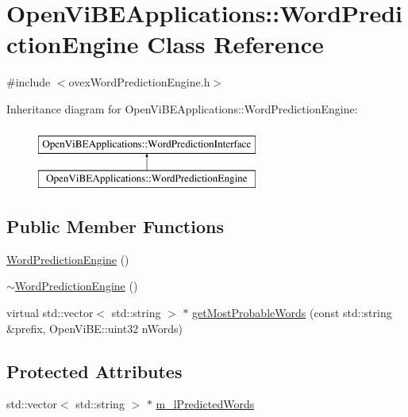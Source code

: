 \hypertarget{classOpenViBEApplications_1_1WordPredictionEngine}{
\section{OpenViBEApplications::WordPredictionEngine Class Reference}
\label{classOpenViBEApplications_1_1WordPredictionEngine}
}


{\ttfamily \#include $<$ovexWordPredictionEngine.h$>$}

Inheritance diagram for OpenViBEApplications::WordPredictionEngine:\begin{figure}[H]
\begin{center}
\leavevmode
\includegraphics[height=2.000000cm]{classOpenViBEApplications_1_1WordPredictionEngine}
\end{center}
\end{figure}
\subsection*{Public Member Functions}
\begin{DoxyCompactItemize}
\item 
\hyperlink{classOpenViBEApplications_1_1WordPredictionEngine_ac9999482f410828e8053f73573176c09}{WordPredictionEngine} ()
\item 
\hyperlink{classOpenViBEApplications_1_1WordPredictionEngine_a992d915c6060ce47e14e9817752f6457}{$\sim$WordPredictionEngine} ()
\item 
virtual std::vector$<$ std::string $>$ $\ast$ \hyperlink{classOpenViBEApplications_1_1WordPredictionEngine_a9a7b3a5dcf9777a120185a34ee19af14}{getMostProbableWords} (const std::string \&prefix, OpenViBE::uint32 nWords)
\end{DoxyCompactItemize}
\subsection*{Protected Attributes}
\begin{DoxyCompactItemize}
\item 
std::vector$<$ std::string $>$ $\ast$ \hyperlink{classOpenViBEApplications_1_1WordPredictionEngine_a3215eeb57bf7e1fabc9756972940a248}{m\_\-lPredictedWords}
\end{DoxyCompactItemize}


